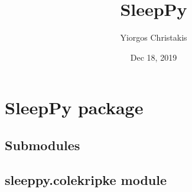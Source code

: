 \documentclass[letterpaper,10pt,english]{sphinxmanual}
\title{SleepPy}
\date{Dec 18, 2019}
\author{Yiorgos Christakis}
\begin{document}
\pagestyle{empty}
\sphinxmaketitle
\pagestyle{plain}
\sphinxtableofcontents
\pagestyle{normal}
\label{\detokenize{index::doc}}



\chapter{SleepPy package}
\label{\detokenize{index:sleeppy-package}}

\section{Submodules}
\label{\detokenize{index:submodules}}

\section{sleeppy.colekripke module}
\label{\detokenize{index:module-sleeppy.colekripke}}\label{\detokenize{index:sleeppy-colekripke-module}}
\end{document}
